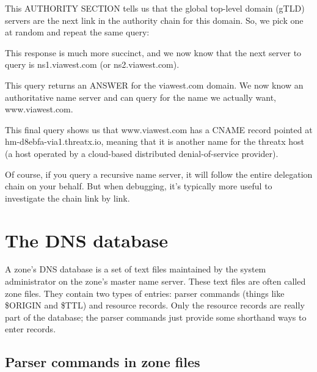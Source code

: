This {AUTHORITY SECTION} tells us that the global top-level domain
(gTLD) servers are the next link in the authority chain for this domain.
So, we pick one at random and repeat the same query:


This response is much more succinct, and we now know that the next
server to query is ns1.viawest.com (or ns2.viawest.com).


This query returns an {ANSWER} for the viawest.com domain. We now know
an authoritative name server and can query for the name we actually
want, www.viawest.com.


This final query shows us that www.viawest.com has a CNAME record
pointed at hm-d8ebfa-via1.threatx.io, meaning that it is another name
for the threatx host (a host operated by a cloud-based distributed
denial-of-service provider).

Of course, if you query a recursive name server, it will follow the
entire delegation chain on your behalf. But when debugging, it's
typically more useful to investigate the chain link by link.



\section{The DNS database}

{\protect\hypertarget{part0024_split_019.htmlux5cux23_idIndexMarker2058}{}{}}A
zone's DNS database is a set of text files maintained by the system
administrator on the zone's master name server. These text files are
often called zone files. They contain two types of entries: parser
commands (things like {\$ORIGIN} and
\protect\hypertarget{part0024_split_019.htmlux5cux23_idIndexMarker2059}{}{}{\$TTL})
and resource records. Only the resource records are really part of the
database; the parser commands just provide some shorthand ways to enter
records.

\protect\hypertarget{part0024_split_020.html}{}{}

\hypertarget{part0024_split_020.htmlux5cux23_idContainer1069}{}
\hypertarget{part0024_split_020.htmlux5cux23calibre_pb_19}{%
\subsection[Parser commands in zone
files]{\texorpdfstring{\protect\hypertarget{part0024_split_020.htmlux5cux23_idTextAnchor866}{}{}Parser
commands in zone
files}{Parser commands in zone files}}\label{part0024_split_020.htmlux5cux23calibre_pb_19}}

